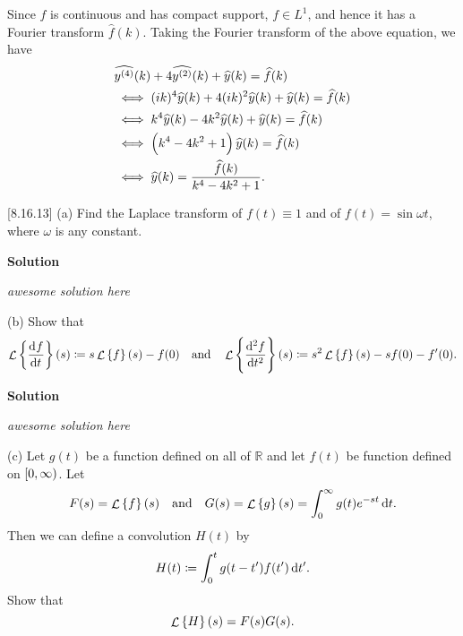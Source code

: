 \documentclass{article}
\DeclareMathOperator{\Lagr}{\mathcal{L}}
\begin{document}
Since $f$ is continuous and has compact support, $f \in L^1$, and hence
it has a Fourier transform $\widehat{f}(k)$. Taking the Fourier
transform of the above equation, we have
%
\begin{align*}
    &\widehat{y^{(4)}}(k) + 4 \widehat{y^{(2)}}(k) + \widehat{y}(k) = \widehat{f}(k) \\
    &\iff (i k)^4 \widehat{y}(k) + 4 (i k)^2 \widehat{y}(k) + \widehat{y}(k) = \widehat{f}(k) \\
    &\iff k^4 \widehat{y}(k) - 4 k^2 \widehat{y}(k) + \widehat{y}(k) = \widehat{f}(k) \\
    &\iff \del{k^4 - 4 k^2 + 1} \widehat{y}(k) = \widehat{f}(k) \\
    &\iff \widehat{y}(k) = \frac{\widehat{f}(k)}{k^4 - 4 k^2 + 1}
    .
\end{align*}
%

\vspace{5mm}

[8.16.13] (a) Find the Laplace transform of $f(t) \equiv 1$ and of
$f(t) = \sin \omega t$, where $\omega$ is any constant.

\textbf{Solution}

\textit{awesome solution here}

\vspace{5mm}

(b) Show that
%
\begin{equation*}
    \Lagr \cbr{\dod{f}{t}}(s) \coloneqq s \Lagr \cbr{f}(s) - f(0)
    \quad \text{and} \quad
    \Lagr \cbr{\dod[2]{f}{t}}(s) \coloneqq s^2 \Lagr \cbr{f}(s) - s f(0) - f^\prime(0)
    .
\end{equation*}

\textbf{Solution}

\textit{awesome solution here}

\vspace{5mm}

(c) Let $g(t)$ be a function defined on all of $\mathbb{R}$ and let
$f(t)$ be function defined on $\intco{0, \infty}$. Let
%
\begin{equation*}
    F(s) = \Lagr \cbr{f}(s)
    \quad \text{and} \quad
    G(s) = \Lagr \cbr{g}(s) = \int_0^\infty g(t) e^{-s t} \dif t
    .
\end{equation*}
%
Then we can define a convolution $H(t)$ by
%
\begin{equation*}
    H(t) \coloneqq \int_0^t g(t - t^\prime) f(t^\prime) \dif t^\prime
    .
\end{equation*}
%
Show that
%
\begin{equation*}
    \Lagr \cbr{H}(s) = F(s) G(s)
    .
\end{equation*}
\end{document}
